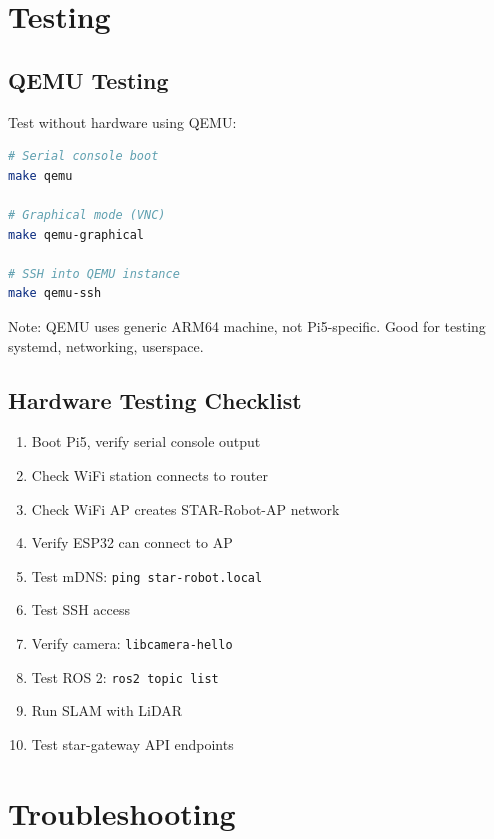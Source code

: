 \documentclass[11pt,letterpaper]{article}
\begin{document}
\section{Testing}

\subsection{QEMU Testing}

Test without hardware using QEMU:

\begin{lstlisting}[language=bash]
# Serial console boot
make qemu

# Graphical mode (VNC)
make qemu-graphical

# SSH into QEMU instance
make qemu-ssh
\end{lstlisting}

Note: QEMU uses generic ARM64 machine, not Pi5-specific. Good for testing systemd, networking, userspace.

\subsection{Hardware Testing Checklist}

\begin{enumerate}
    \item Boot Pi5, verify serial console output
    \item Check WiFi station connects to router
    \item Check WiFi AP creates STAR-Robot-AP network
    \item Verify ESP32 can connect to AP
    \item Test mDNS: \texttt{ping star-robot.local}
    \item Test SSH access
    \item Verify camera: \texttt{libcamera-hello}
    \item Test ROS 2: \texttt{ros2 topic list}
    \item Run SLAM with LiDAR
    \item Test star-gateway API endpoints
\end{enumerate}

\section{Troubleshooting}
\end{document}
